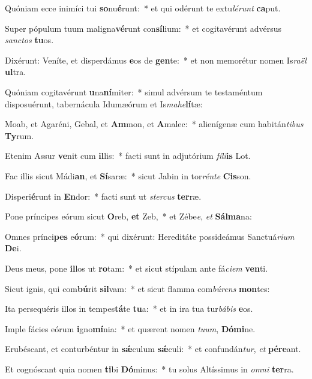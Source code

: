 \item Quóniam ecce inimíci tui \textbf{so}nu\textbf{é}runt:~* et qui odérunt te extu\textit{lé}\textit{runt} \textbf{ca}put.
\item Super pópulum tuum maligna\textbf{vé}runt con\textbf{sí}lium:~* et cogitavérunt advérsus \textit{sanc}\textit{tos} \textbf{tu}os.
\item Dixérunt: Veníte, et disperdámus \textbf{e}os de \textbf{gen}te:~* et non memorétur nomen Is\textit{ra}\textit{ël} \textbf{ul}tra.
\item Quóniam cogitavérunt \textbf{u}na\textbf{ní}miter:~* simul advérsum te testaméntum disposuérunt, tabernácula Idumæórum et Is\textit{ma}\textit{he}\textbf{lí}tæ:
\item Moab, et Agaréni, Gebal, et \textbf{Am}mon, et \textbf{A}malec:~* alienígenæ cum habitán\textit{ti}\textit{bus} \textbf{Ty}rum.
\item Etenim Assur \textbf{ve}nit cum \textbf{il}lis:~* facti sunt in adjutórium \textit{fí}\textit{li}\textbf{is} Lot.
\item Fac illis sicut Mádi\textbf{an}, et \textbf{Sí}saræ:~* sicut Jabin in tor\textit{rén}\textit{te} \textbf{Cis}son.
\item Disperi\textbf{é}runt in \textbf{En}dor:~* facti sunt ut \textit{ster}\textit{cus} \textbf{ter}ræ.
\item Pone príncipes eórum sicut \textbf{O}reb, \textbf{et} Zeb,~* et Zébe\textit{e}, \textit{et} \textbf{Sál}\textbf{ma}na:
\item Omnes prínci\textbf{pes} e\textbf{ó}rum:~* qui dixérunt: Hereditáte possideámus Sanctuá\textit{ri}\textit{um} \textbf{De}i.
\item Deus meus, pone \textbf{il}los ut \textbf{ro}tam:~* et sicut stípulam ante fá\textit{ci}\textit{em} \textbf{ven}ti.
\item Sicut ignis, qui com\textbf{bú}rit \textbf{sil}vam:~* et sicut flamma com\textit{bú}\textit{rens} \textbf{mon}tes:
\item Ita persequéris illos in tempes\textbf{tá}te \textbf{tu}a:~* et in ira tua tur\textit{bá}\textit{bis} \textbf{e}os.
\item Imple fácies eórum \textbf{i}gno\textbf{mí}nia:~* et quærent nomen \textit{tu}\textit{um}, \textbf{Dó}\textbf{mi}ne.
\item Erubéscant, et conturbéntur in \textbf{sǽ}culum \textbf{sǽ}culi:~* et confundán\textit{tur}, \textit{et} \textbf{pér}\textbf{e}ant.
\item Et cognóscant quia nomen \textbf{ti}bi \textbf{Dó}minus:~* tu solus Altíssimus in \textit{om}\textit{ni} \textbf{ter}ra.
